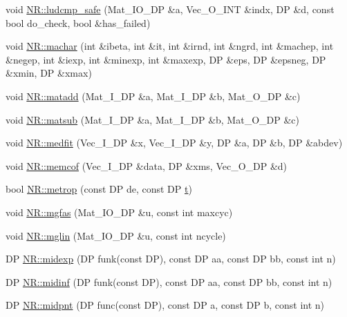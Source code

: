 \begin{DoxyCompactItemize}
\item 
void \mbox{\hyperlink{namespaceNR_a03fd0ba9f0721c1fe3355bd81704727d}{N\+R\+::ludcmp\+\_\+safe}} (Mat\+\_\+\+I\+O\+\_\+\+DP \&a, Vec\+\_\+\+O\+\_\+\+I\+NT \&indx, DP \&d, const bool do\+\_\+check, bool \&has\+\_\+failed)
\item 
void \mbox{\hyperlink{namespaceNR_ac38efbaed34a2e071711a215801215fd}{N\+R\+::machar}} (int \&ibeta, int \&it, int \&irnd, int \&ngrd, int \&machep, int \&negep, int \&iexp, int \&minexp, int \&maxexp, DP \&eps, DP \&epsneg, DP \&xmin, DP \&xmax)
\item 
void \mbox{\hyperlink{namespaceNR_a3e83e821eb8a08def3eb745893d705f0}{N\+R\+::matadd}} (Mat\+\_\+\+I\+\_\+\+DP \&a, Mat\+\_\+\+I\+\_\+\+DP \&b, Mat\+\_\+\+O\+\_\+\+DP \&c)
\item 
void \mbox{\hyperlink{namespaceNR_a3813813f04cdd8f245c3aa44ff4f445d}{N\+R\+::matsub}} (Mat\+\_\+\+I\+\_\+\+DP \&a, Mat\+\_\+\+I\+\_\+\+DP \&b, Mat\+\_\+\+O\+\_\+\+DP \&c)
\item 
void \mbox{\hyperlink{namespaceNR_aab044381afb3d475fea1f56f27b43677}{N\+R\+::medfit}} (Vec\+\_\+\+I\+\_\+\+DP \&x, Vec\+\_\+\+I\+\_\+\+DP \&y, DP \&a, DP \&b, DP \&abdev)
\item 
void \mbox{\hyperlink{namespaceNR_a160cae226a21c3be206ce06f63125499}{N\+R\+::memcof}} (Vec\+\_\+\+I\+\_\+\+DP \&data, DP \&xms, Vec\+\_\+\+O\+\_\+\+DP \&d)
\item 
bool \mbox{\hyperlink{namespaceNR_ad1c330f016bd9cbd3564f4be1f09d5db}{N\+R\+::metrop}} (const DP de, const DP \mbox{\hyperlink{adat__devel_2lib_2hadron_2hadron__timeslice_8cc_ac310d9181e916ba43604099aee272c71}{t}})
\item 
void \mbox{\hyperlink{namespaceNR_ae5a8be9b136a41fa270bef965c7560bd}{N\+R\+::mgfas}} (Mat\+\_\+\+I\+O\+\_\+\+DP \&u, const int maxcyc)
\item 
void \mbox{\hyperlink{namespaceNR_a462e1290733dd6e89382065234a02f91}{N\+R\+::mglin}} (Mat\+\_\+\+I\+O\+\_\+\+DP \&u, const int ncycle)
\item 
DP \mbox{\hyperlink{namespaceNR_ab0417b8e3403a5388e1335cf434a9f97}{N\+R\+::midexp}} (DP funk(const DP), const DP aa, const DP bb, const int n)
\item 
DP \mbox{\hyperlink{namespaceNR_ab1e98fd1024d49b2e58d93057dd0a7f1}{N\+R\+::midinf}} (DP funk(const DP), const DP aa, const DP bb, const int n)
\item 
DP \mbox{\hyperlink{namespaceNR_a0d1a3671e190c043c51cc06aa203ff71}{N\+R\+::midpnt}} (DP func(const DP), const DP a, const DP b, const int n)

\end{DoxyCompactItemize}
